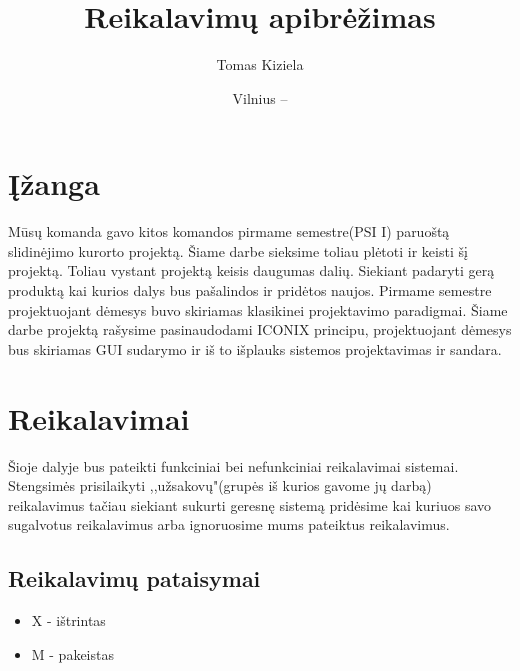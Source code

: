 \documentclass[oneside]{VUMIFPSkursinis}
\title{Reikalavimų apibrėžimas}
\author{Tomas Kiziela}
\date{Vilnius – \the\year}
\begin{document}
\maketitle
\tableofcontents

\section{Įžanga}
Mūsų komanda gavo kitos komandos pirmame semestre(PSI I) paruoštą slidinėjimo kurorto projektą. Šiame darbe sieksime toliau plėtoti ir keisti šį projektą. Toliau vystant projektą keisis daugumas dalių. Siekiant padaryti gerą produktą kai kurios  dalys bus pašalindos ir pridėtos naujos. Pirmame semestre projektuojant dėmesys buvo skiriamas klasikinei projektavimo paradigmai. Šiame darbe projektą rašysime pasinaudodami ICONIX principu, projektuojant dėmesys bus skiriamas GUI sudarymo ir iš to išplauks sistemos projektavimas ir sandara. 

\section{Reikalavimai}
Šioje dalyje bus pateikti funkciniai bei nefunkciniai reikalavimai sistemai. Stengsimės prisilaikyti ,,užsakovų"(grupės iš kurios gavome jų darbą) reikalavimus tačiau siekiant sukurti geresnę sistemą pridėsime kai kuriuos savo sugalvotus reikalavimus arba ignoruosime mums pateiktus reikalavimus. 

\subsection{Reikalavimų pataisymai}
	\begin{itemize}
		\item{X - ištrintas}
		\item{M - pakeistas}
	\end{itemize}

\end{document}

